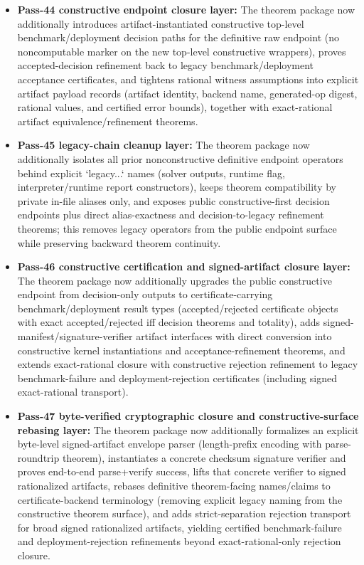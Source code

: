 \begin{itemize}
\item \textbf{Pass-44 constructive endpoint closure layer:} The theorem package now additionally introduces artifact-instantiated constructive top-level benchmark/deployment decision paths for the definitive raw endpoint (no noncomputable marker on the new top-level constructive wrappers), proves accepted-decision refinement back to legacy benchmark/deployment acceptance certificates, and tightens rational witness assumptions into explicit artifact payload records (artifact identity, backend name, generated-op digest, rational values, and certified error bounds), together with exact-rational artifact equivalence/refinement theorems.
\item \textbf{Pass-45 legacy-chain cleanup layer:} The theorem package now additionally isolates all prior nonconstructive definitive endpoint operators behind explicit `legacy...` names (solver outputs, runtime flag, interpreter/runtime report constructors), keeps theorem compatibility by private in-file aliases only, and exposes public constructive-first decision endpoints plus direct alias-exactness and decision-to-legacy refinement theorems; this removes legacy operators from the public endpoint surface while preserving backward theorem continuity.
\item \textbf{Pass-46 constructive certification and signed-artifact closure layer:} The theorem package now additionally upgrades the public constructive endpoint from decision-only outputs to certificate-carrying benchmark/deployment result types (accepted/rejected certificate objects with exact accepted/rejected iff decision theorems and totality), adds signed-manifest/signature-verifier artifact interfaces with direct conversion into constructive kernel instantiations and acceptance-refinement theorems, and extends exact-rational closure with constructive rejection refinement to legacy benchmark-failure and deployment-rejection certificates (including signed exact-rational transport).
\item \textbf{Pass-47 byte-verified cryptographic closure and constructive-surface rebasing layer:} The theorem package now additionally formalizes an explicit byte-level signed-artifact envelope parser (length-prefix encoding with parse-roundtrip theorem), instantiates a concrete checksum signature verifier and proves end-to-end parse+verify success, lifts that concrete verifier to signed rationalized artifacts, rebases definitive theorem-facing names/claims to certificate-backend terminology (removing explicit legacy naming from the constructive theorem surface), and adds strict-separation rejection transport for broad signed rationalized artifacts, yielding certified benchmark-failure and deployment-rejection refinements beyond exact-rational-only rejection closure.

\end{itemize}

